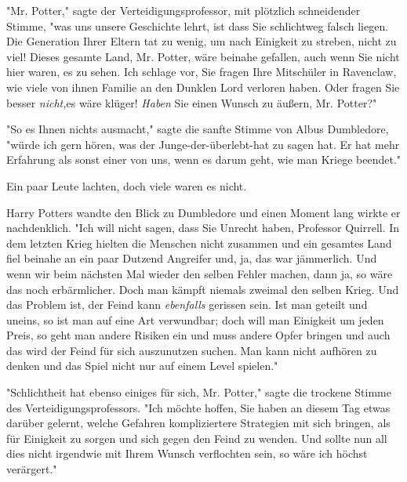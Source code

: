 {"Mr. Potter," sagte der Verteidigungsprofessor, mit plötzlich schneidender Stimme, "was uns unsere Geschichte lehrt, ist dass Sie schlichtweg falsch liegen. Die Generation Ihrer Eltern tat zu wenig, um nach Einigkeit zu streben, nicht zu viel! Dieses gesamte Land, Mr. Potter, wäre beinahe gefallen, auch wenn Sie nicht hier waren, es zu sehen. Ich schlage vor, Sie fragen Ihre Mitschüler in Ravenclaw, wie viele von ihnen Familie an den Dunklen Lord verloren haben. Oder fragen Sie besser \emph{nicht,}es wäre klüger! \emph{Haben} Sie einen Wunsch zu äußern, Mr. Potter?"

"So es Ihnen nichts ausmacht," sagte die sanfte Stimme von Albus Dumbledore, "würde ich gern hören, was der Junge-der-überlebt-hat zu sagen hat. Er hat mehr Erfahrung als sonst einer von uns, wenn es darum geht, wie man Kriege beendet."

Ein paar Leute lachten, doch viele waren es nicht.

Harry Potters wandte den Blick zu Dumbledore und einen Moment lang wirkte er nachdenklich. "Ich will nicht sagen, dass Sie Unrecht haben, Professor Quirrell. In dem letzten Krieg hielten die Menschen nicht zusammen und ein gesamtes Land fiel beinahe an ein paar Dutzend Angreifer und, ja, das war jämmerlich. Und wenn wir beim nächsten Mal wieder den selben Fehler machen, dann ja, so wäre das noch erbärmlicher. Doch man kämpft niemals zweimal den selben Krieg. Und das Problem ist, der Feind kann \emph{ebenfalls} gerissen sein. Ist man geteilt und uneins, so ist man auf eine Art verwundbar; doch will man Einigkeit um jeden Preis, so geht man andere Risiken ein und muss andere Opfer bringen und auch das wird der Feind für sich auszunutzen suchen. Man kann nicht aufhören zu denken und das Spiel nicht nur auf einem Level spielen."

"Schlichtheit hat ebenso einiges für sich, Mr. Potter," sagte die trockene Stimme des Verteidigungsprofessors. "Ich möchte hoffen, Sie haben an diesem Tag etwas darüber gelernt, welche Gefahren kompliziertere Strategien mit sich bringen, als für Einigkeit zu sorgen und sich gegen den Feind zu wenden. Und sollte nun all dies nicht irgendwie mit Ihrem Wunsch verflochten sein, so wäre ich höchst verärgert."

}
